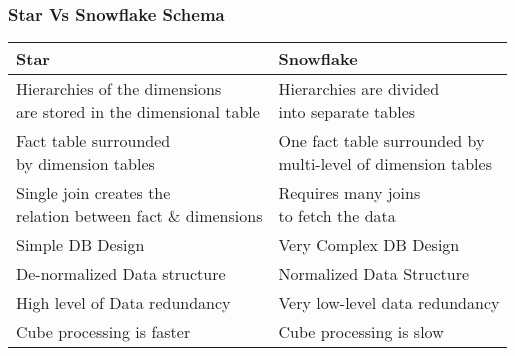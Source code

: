 \begin{frame}
\frametitle{Star Vs Snowflake Schema}

	\begin{tabular}{| l | l |}
		\hline
		Star & Snowflake\\
		\hline
		 \makecell{Hierarchies of the dimensions\\are stored in the dimensional table} &  \makecell{Hierarchies are divided\\ into separate tables}\\
		 		\hline
		\makecell{Fact table surrounded\\ by dimension tables} & 
		\makecell{One fact table surrounded by\\multi-level of dimension tables} \\
				\hline
		 \makecell{Single join creates the\\relation between fact \& dimensions}
		 & \makecell{Requires many joins\\ to fetch the data}\\
 		\hline
		Simple DB Design & Very Complex DB Design\\
		\hline
		De-normalized Data structure & Normalized Data Structure\\
		\hline
		High level of Data redundancy & Very low-level data redundancy\\
		\hline
		Cube processing is faster & Cube processing is slow\\%
		\hline
	\end{tabular}


\end{frame}





